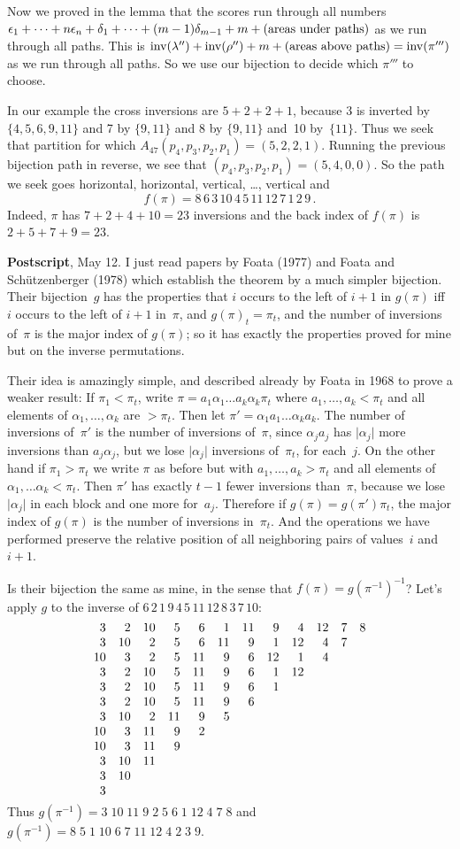 Now we proved in the lemma that the scores run through all numbers
$\epsilon_1+\cdots+n\epsilon_n+\delta_1+\cdots+(m-1)\delta_{m-1}+m+(\hbox{areas
under paths})$ as we run through all paths. This is ${\rm inv}(\lambda'')+
{\rm inv}(\rho'')+m+(\hbox{areas above paths})={\rm inv}(\pi''')$ as we run
through all paths. So we use our bijection to decide which $\pi'''$ to choose.

In our example the cross inversions are $5+2+2+1$, because 3 is inverted by
$\{4,5,6,9,11\}$ and 7 by $\{9,11\}$ and 8 by $\{9,11\}$ and~10 by~$\{11\}$.
 Thus we seek that partition for
which $A_{47}(p_4,p_3,p_2,p_1)=(5,2,2,1)$. Running the previous bijection path
in reverse, we see that $(p_4,p_3,p_2,p_1)=(5,4,0,0)$. So the path we seek goes
horizontal, horizontal, vertical, \dots , vertical and
$$f(\pi)=8\,6\,3\,10\,4\,5\,11\,12\,7\,1\,2\,9\,.$$
Indeed, $\pi$ has $7+2+4+10=23$ inversions and the back index of $f(\pi)$ is
$2+5+7+9=23$.

\medskip\noindent
{\bf Postscript}, May 12.
I just read papers by Foata (1977) and Foata and Sch\"utzenberger (1978) which
establish the theorem by a much simpler bijection. Their bijection~$g$ has the
properties that $i$ occurs to the left of $i+1$ in $g(\pi)$ iff $i$ occurs to
the left of $i+1$ in~$\pi$, and $g(\pi)_t=\pi_t$, and the number of inversions
of~$\pi$ is the major index of $g(\pi)$; so it has exactly the properties
proved for mine but on the inverse permutations.

Their idea is amazingly simple, and described already by Foata in 1968 to prove
a weaker result: If $\pi_1<\pi_t$, write $\pi=a_1\alpha_1\ldots
a_k\alpha_k\pi_t$ where $a_1,\ldots,a_k<\pi_t$ and all elements of
$\alpha_1,\ldots,\alpha_k$ are $>\pi_t$. Then let $\pi'=\alpha_1a_1\ldots
\alpha_k a_k$. The number of inversions of~$\pi'$ is the number of inversions
of~$\pi$, since $\alpha_ja_j$ has $\vert\alpha_j\vert$ more inversions than
$a_j\alpha_j$, but we lose $\vert\alpha_j\vert$ inversions of~$\pi_t$, for
each~$j$. On the other hand if $\pi_1>\pi_t$ we write $\pi$ as before but with
$a_1,\ldots,a_k>\pi_t$ and all elements of $\alpha_1,\ldots\alpha_k<\pi_t$.
Then $\pi'$ has exactly $t-1$ fewer inversions than~$\pi$, because we lose
$\vert\alpha_j\vert$ in each block and one more for~$a_j$. Therefore if
$g(\pi)=g(\pi')\pi_t$, the major index of $g(\pi)$ is the number of inversions
in~$\pi_t$. And the operations we have performed preserve the relative position
of all neighboring pairs of values~$i$ and~$i+1$.

Is their bijection the same as mine, in the sense that
$f(\pi)=g(\pi^{-1})^{-1}$? Let's apply $g$ to the inverse of
$6\,2\,1\,9\,4\,5\,11\,12\,8\,3\,7\,10$:
$$\vcenter{\halign{\hfil#\quad&\hfil#\quad&\hfil#\quad&\hfil#\quad
&\hfil#\quad&\hfil#\quad&\hfil#\quad&\hfil#\quad
&\hfil#\quad&\hfil#\quad&\hfil#\quad&\hfil#\cr
3&2&10&5&6&1&11&9&4&12&7&8\cr
3&10&2&5&6&11&9&1&12&4&7\cr
10&3&2&5&11&9&6&12&1&4\cr
3&2&10&5&11&9&6&1&12\cr
3&2&10&5&11&9&6&1\cr
3&2&10&5&11&9&6\cr
3&10&2&11&9&5\cr
10&3&11&9&2\cr
10&3&11&9\cr
3&10&11\cr
3&10\cr
3\cr}}$$
Thus $g(\pi^{-1})=3\;10\;11\;9\;2\;5\;6\;1\;12\;4\;7\;8$
and $g(\pi^{-1})=8\;5\;1\;10\;6\;7\;11\;12\;4\;2\;3\;9$.

